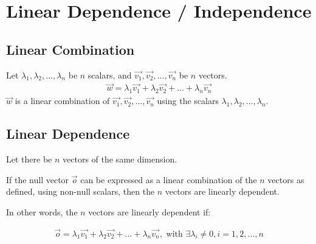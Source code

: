 \documentclass{article}
\begin{document}
\section{Linear Dependence / Independence}
\subsection{Linear Combination}
Let $\lambda_1, \lambda_2, ..., \lambda_n$ be $n$ scalars, and $\vec{v_1}, \vec{v_2}, ..., \vec{v_n}$ be $n$ vectors.
\begin{align*}
    \vec{w} = \lambda_1 \vec{v_1} + \lambda_2 \vec{v_2} + ... + \lambda_n \vec{v_n}
\end{align*}
$\vec{w}$ is a linear combination of $\vec{v_1}, \vec{v_2}, ..., \vec{v_n}$ using the scalars $\lambda_1, \lambda_2, ..., \lambda_n$.

\subsection{Linear Dependence}

Let there be $n$ vectors of the same dimension.

If the null vector $\vec{o}$ can be expressed as a linear combination of the $n$ vectors as defined, using non-null scalars, then the $n$ vectors are linearly dependent.

In other words, the $n$ vectors are linearly dependent if:

\begin{align*}
    \vec{o} = \lambda_1 \vec{v_1} + \lambda_2 \vec{v_2} + ... + \lambda_n \vec{v_n}, \text{ with } \exists \lambda_i \neq 0, i = 1, 2, ..., n
\end{align*}
\end{document}
